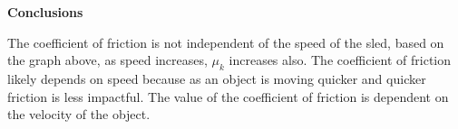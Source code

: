 \documentclass[12pt]{article}
\begin{document}
\textbf{Conclusions}

The coefficient of friction is not independent of the speed of the sled, based on the graph above,
as speed increases, $\mu_k$ increases also.
The coefficient of friction likely depends on speed because as an object is moving quicker and quicker
friction is less impactful. The value of the coefficient of friction is dependent on the velocity of the object.
\end{document}
